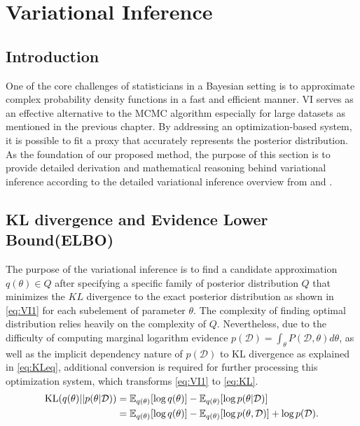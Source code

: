 \section{Variational Inference}
\label{VI}
\subsection{Introduction}
One of the core challenges of statisticians in a Bayesian setting is to approximate complex probability density functions in a fast and efficient manner. VI serves as an effective alternative to the MCMC algorithm especially for large datasets as mentioned in the previous chapter. By addressing an optimization-based system, it is possible to fit a proxy that accurately represents the posterior distribution. As the  foundation of our proposed method, the purpose of this section is to provide detailed derivation and mathematical reasoning behind variational inference according to the detailed variational inference overview from \cite{blei_kucukelbir_mcauliffe_2017} and \cite{bishop_2006}.
\subsection{KL divergence and Evidence Lower Bound(ELBO)}
The purpose of the variational inference is to find a candidate approximation $q(\theta) \in Q$ after specifying a specific family of posterior distribution $Q$ that minimizes the $KL$ divergence to the exact posterior distribution as shown in \autoref{eq:VI1} for each subelement of parameter $\theta$. The complexity of finding optimal distribution relies heavily on the complexity of $Q$. Nevertheless, due to the difficulty of computing marginal logarithm evidence $p(\mathcal{D}) = \int_{\theta} P(\mathcal{D},\theta)d\theta$, as well as the implicit dependency nature of $p(\mathcal{D})$ to KL divergence as explained in \autoref{eq:KLeq}, additional conversion is required for further processing this optimization system, which transforms \autoref{eq:VI1} to \autoref{eq:KL}. 
\begin{equation}
	\label{eq:KLeq}
	\begin{aligned}
		\text{KL}(q(\theta)||p(\theta|\mathcal{D})) &= \mathop{\mathbb{E}_{q(\theta)}}[\textnormal{log}\,q(\theta)] - \mathop{\mathbb{E}_{q(\theta)}}[\textnormal{log}\,p(\theta|\mathcal{D})]\\
		& = 
		\mathop{\mathbb{E}_{q(\theta)}}[\textnormal{log}\, q(\theta)] - \mathop{\mathbb{E}_{q(\theta)}}[\textnormal{log}\, p(\theta,\mathcal{D})]+ \textnormal{log} \, p(\mathcal{D}).\\
	\end{aligned}
\end{equation}
